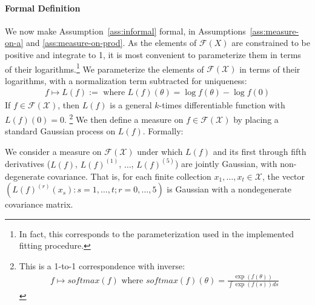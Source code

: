 \paragraph*{Formal Definition}
We now make Assumption~\ref{ass:informal} formal, in Assumptions~\ref{ass:measure-on-a} and \ref{ass:measure-on-prod}.
As the elements of $\mathcal{F}(X)$ are constrained to be positive and integrate to 1, it is most convenient to parameterize them in terms of their logarithms.\footnote{In fact, this corresponds to the parameterization used in the implemented fitting procedure.}
We parameterize the elements of $\mathcal{F}(\mathcal{X})$ in terms of their logarithms, with a normalization term subtracted for uniqueness:
\begin{align*}
f \mapsto L(f) := \text{ where } L(f)(\theta) = \log f(\theta) - \log f(0)
\end{align*}
If $f \in \mathcal{F}(\mathcal{X})$, then $L(f)$ is a general $k$-times differentiable function with $L(f)(0) = 0$.
\footnote{This is a 1-to-1 correspondence with inverse:
\begin{align*}
f \mapsto softmax(f)  \text{ where }  softmax(f)(\theta) = \frac{\exp(f(\theta))}{\int \exp(f(s)) ds} 
\end{align*}}
We then define a measure on $f \in \mathcal{F}(\mathcal{X})$ by placing a standard Gaussian process on $L(f)$. Formally:

\begin{assumption}\label{ass:measure-on-a}
We consider a measure on $\mathcal{F}(\mathcal{X})$ under which $L(f)$ and its first through fifth derivatives 
($L(f)$, $L(f)^{(1)}$, $\dots$, $L(f)^{(5)}$) are jointly Gaussian, with non-degenerate covariance. That is, for each finite collection $x_1, \dots, x_t \in \mathcal{X}$, the vector $(L(f)^{(r)}(x_s) : s=1,\dots,t; r=0,\dots,5)$ is Gaussian with a nondegenerate covariance matrix. %
\end{assumption}


